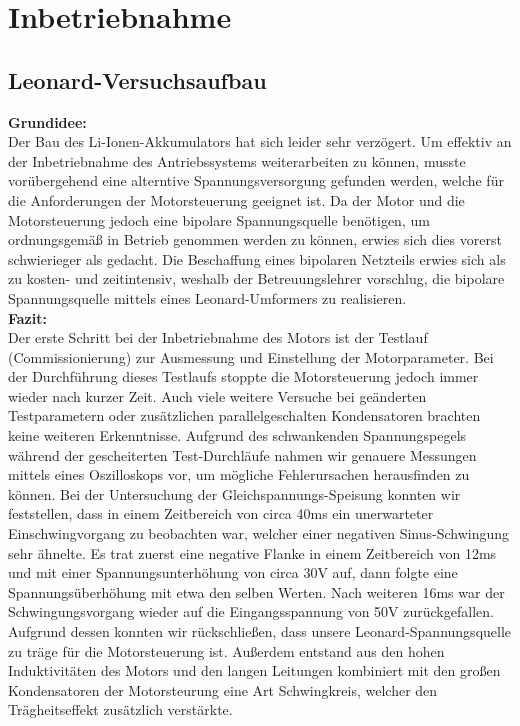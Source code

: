 \newpage


\section{Inbetriebnahme}
\subsection{Leonard-Versuchsaufbau}
\textbf{Grundidee:}
\\[2mm]
Der Bau des Li-Ionen-Akkumulators hat sich leider sehr verzögert. Um effektiv an der Inbetriebnahme des Antriebssystems weiterarbeiten zu können, musste vorübergehend eine alterntive Spannungsversorgung gefunden werden, welche für die Anforderungen der Motorsteuerung geeignet ist. Da der Motor und die Motorsteuerung jedoch eine bipolare Spannungsquelle benötigen, um ordnungsgemäß in Betrieb genommen werden zu können, erwies sich dies vorerst schwierieger als gedacht. Die Beschaffung eines bipolaren Netzteils erwies sich als zu kosten- und zeitintensiv, weshalb der Betreuungslehrer vorschlug, die bipolare Spannungsquelle mittels eines Leonard-Umformers zu realisieren.
\\[5mm]

\textbf{Fazit:}
\\[2mm]
Der erste Schritt bei der Inbetriebnahme des Motors ist der Testlauf (Commissionierung) zur Ausmessung und Einstellung der Motorparameter. Bei der Durchführung dieses Testlaufs stoppte die Motorsteuerung jedoch immer wieder nach kurzer Zeit. Auch viele weitere Versuche bei geänderten Testparametern oder zusätzlichen parallelgeschalten Kondensatoren brachten keine weiteren Erkenntnisse. Aufgrund des schwankenden Spannungspegels während der gescheiterten Test-Durchläufe nahmen wir genauere Messungen mittels eines Oszilloskops vor, um mögliche Fehlerursachen herausfinden zu können. Bei der Untersuchung der Gleichspannungs-Speisung konnten wir feststellen, dass in einem Zeitbereich von circa 40ms ein unerwarteter Einschwingvorgang zu beobachten war, welcher einer negativen Sinus-Schwingung sehr ähnelte. Es trat zuerst eine negative Flanke in einem Zeitbereich von 12ms und mit einer Spannungsunterhöhung von circa 30V auf, dann folgte eine Spannungsüberhöhung mit etwa den selben Werten. Nach weiteren 16ms war der Schwingungsvorgang wieder auf die Eingangsspannung von 50V zurückgefallen. Aufgrund dessen konnten wir rückschließen, dass unsere Leonard-Spannungsquelle zu träge für die Motorsteuerung ist. Außerdem entstand aus den hohen Induktivitäten des Motors und den langen Leitungen kombiniert mit den großen Kondensatoren der Motorsteurung eine Art Schwingkreis, welcher den Trägheitseffekt zusätzlich verstärkte.

